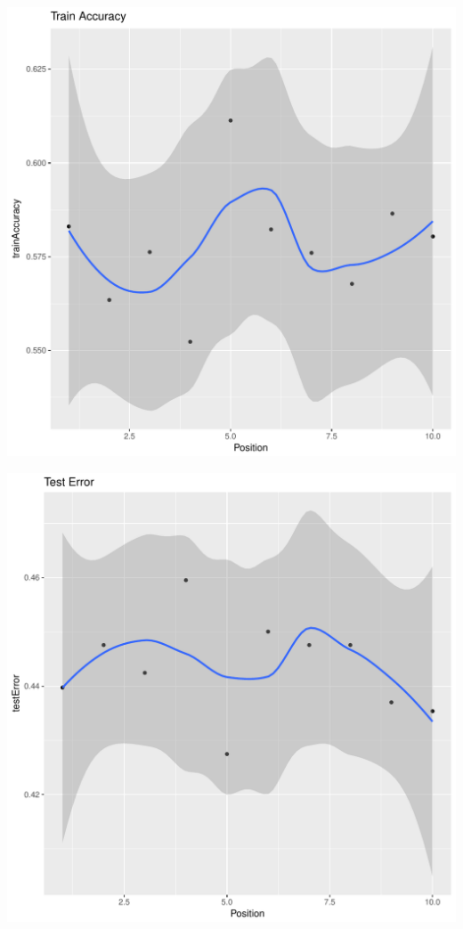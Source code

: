\documentclass{article}\usepackage[]{graphicx}\usepackage[]{color}
\makeatletter
\def\maxwidth{ %
  \ifdim\Gin@nat@width>\linewidth
    \linewidth
  \else
    \Gin@nat@width
  \fi
}
\newenvironment{kframe}{%
 \def\at@end@of@kframe{}%
 \ifinner\ifhmode%
  \def\at@end@of@kframe{\end{minipage}}%
  \begin{minipage}{\columnwidth}%
 \fi\fi%
 \def\FrameCommand##1{\hskip\@totalleftmargin \hskip-\fboxsep
 \colorbox{shadecolor}{##1}\hskip-\fboxsep
     \hskip-\linewidth \hskip-\@totalleftmargin \hskip\columnwidth}%
 \MakeFramed {\advance\hsize-\width
   \@totalleftmargin\z@ \linewidth\hsize
   \@setminipage}}%
 {\par\unskip\endMakeFramed%
 \at@end@of@kframe}
\newenvironment{knitrout}{}{} %
\makeatother
\begin{document}
\begin{knitrout}
\begin{kframe}
{\ttfamily\noindent\itshape\color{messagecolor}{\#\# `geom\_smooth()` using method = 'loess'}}\end{kframe}
\includegraphics[width=\maxwidth]{figure/unnamed-chunk-31-4} 
\begin{kframe}

{\ttfamily\noindent\itshape\color{messagecolor}{\#\# `geom\_smooth()` using method = 'loess'}}\end{kframe}
\includegraphics[width=\maxwidth]{figure/unnamed-chunk-31-5} 
\begin{kframe}


\end{kframe}
\end{knitrout}
\end{document}
